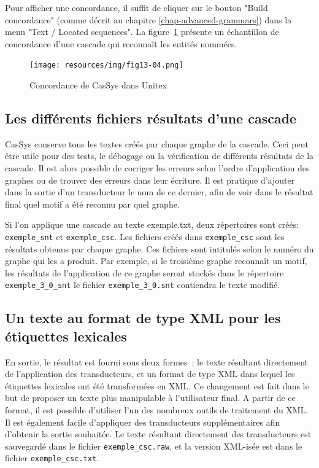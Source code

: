 \bigskip
\noindent Pour afficher une concordance, il suffit de cliquer sur le bouton "Build concordance"
(comme décrit au chapitre \ref{chap-advanced-grammars}) dans la menu "Text / Located sequences".
La figure~\ref{fig13-04} présente un échantillon de concordance d'une cascade qui reconnaît les entités
nommées.


\begin{figure}[!htb]
  \centering
  \texttt{[image: resources/img/fig13-04.png]}
  \caption{Concordance de CasSys dans Unitex}
  \label{fig13-04}
\end{figure}

\subsection{Les différents fichiers résultats d'une cascade}

CasSys conserve tous les textes créés par chaque graphe  de la cascade. Ceci peut être
utile  pour des tests, le débogage ou la vérification de différents résultats de la cascade. Il est
alors possible de corriger les erreurs selon l'ordre d'application des graphes ou de trouver des
erreurs dans leur écriture. Il est pratique d'ajouter dans la sortie d'un transducteur le nom de ce
dernier, afin de voir dans le résultat final quel motif a été reconnu par quel graphe.

Si l'on applique une cascade au texte exemple.txt, deux répertoires sont créés:
\verb+exemple_snt+ et \verb+exemple_csc+.
Les fichiers créés dans \verb+exemple_csc+ sont les résultats obtenus par
chaque graphe. Ces fichiers sont intitulés selon le numéro du graphe qui les a produit. Par exemple, si le
troisième graphe reconnaît un motif, les résultats de l'application de ce graphe seront stockés dans le 
répertoire  \verb+exemple_3+\newline\verb+_0_snt+ le fichier \verb+exemple_3_0.snt+ contiendra le texte modifié.

\subsection{Un texte au format de type XML pour les étiquettes lexicales}

En sortie, le résultat est fourni sous deux formes~: le texte résultant directement de l'application
des transducteurs, et un format de type XML dans lequel les étiquettes lexicales ont été transformées en XML.
Ce changement est fait dans le but de proposer un texte plus manipulable  à l'utilisateur final.
A partir de ce format, il est possible d'utiliser l'un des nombreux outils de traitement du XML.
Il est également facile d'appliquer des transducteurs supplémentaires afin d'obtenir la sortie souhaitée.
Le texte résultant directement des transducteurs est sauvegardé dans le fichier  \verb+exemple_csc.raw+,
et la version  XML-isée est dans le fichier \verb+exemple_csc.txt+.

